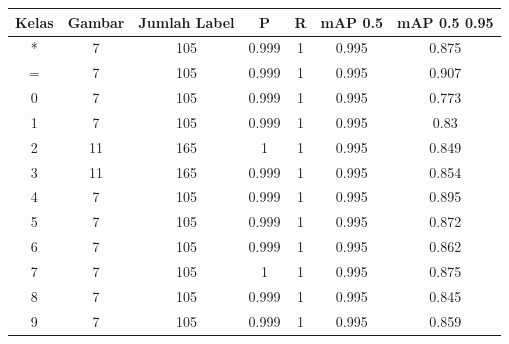 \begin{center}
  \begin{longtable}[c]{|c|c|c|c|c|c|c|}
    \hline
    \textbf{Kelas} & \textbf{Gambar} & \textbf{Jumlah Label} & \textbf{P} & \textbf{R} & \textbf{mAP 0.5} & \textbf{mAP 0.5 0.95} \\ \hline
    \endfirsthead
    \endhead
    *              & 7                          & 105                   & 0.999      & 1          & 0.995            & 0.875                 \\ \hline
    =              & 7                          & 105                   & 0.999      & 1          & 0.995            & 0.907                 \\ \hline
    0              & 7                          & 105                   & 0.999      & 1          & 0.995            & 0.773                 \\ \hline
    1              & 7                          & 105                   & 0.999      & 1          & 0.995            & 0.83                  \\ \hline
    2              & 11                         & 165                   & 1          & 1          & 0.995            & 0.849                 \\ \hline
    3              & 11                         & 165                   & 0.999      & 1          & 0.995            & 0.854                 \\ \hline
    4              & 7                          & 105                   & 0.999      & 1          & 0.995            & 0.895                 \\ \hline
    5              & 7                          & 105                   & 0.999      & 1          & 0.995            & 0.872                 \\ \hline
    6              & 7                          & 105                   & 0.999      & 1          & 0.995            & 0.862                 \\ \hline
    7              & 7                          & 105                   & 1          & 1          & 0.995            & 0.875                 \\ \hline
    8              & 7                          & 105                   & 0.999      & 1          & 0.995            & 0.845                 \\ \hline
    9              & 7                          & 105                   & 0.999      & 1          & 0.995            & 0.859                 \\ \hline

\end{longtable}
\end{center}
